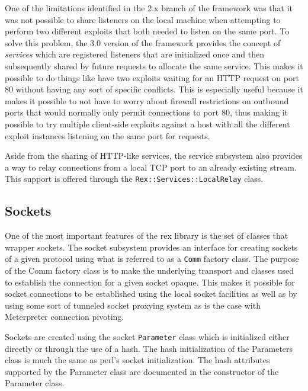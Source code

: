 \documentclass{report}
\begin{document}
\par
One of the limitations identified in the 2.x branch of the framework
was that it was not possible to share listeners on the local machine
when attempting to perform two different exploits that both needed
to listen on the same port.  To solve this problem, the 3.0 version
of the framework provides the concept of \textit{services} which are
registered listeners that are initialized once and then subsequently
shared by future requests to allocate the same service.  This makes
it possible to do things like have two exploits waiting for an HTTP
request on port 80 without having any sort of specific conflicts.
This is especially useful because it makes it possible to not have
to worry about firewall restrictions on outbound ports that would
normally only permit connections to port 80, thus making it possible
to try multiple client-side exploits against a host with all the
different exploit instances listening on the same port for requests.

\par
Aside from the sharing of HTTP-like services, the service subsystem
also provides a way to relay connections from a local TCP port to an
already existing stream.  This support is offered through the
\texttt{Rex::Services::LocalRelay} class.

        \subsection{Sockets}

\par
One of the most important features of the rex library is the set of
classes that wrapper sockets.  The socket subsystem provides an
interface for creating sockets of a given protocol using what is
referred to as a \texttt{Comm} factory class.  The purpose of the
Comm factory class is to make the underlying transport and classes
used to establish the connection for a given socket opaque.  This
makes it possible for socket connections to be established using the
local socket facilities as well as by using some sort of tunneled
socket proxying system as is the case with Meterpreter connection
pivoting.

\par
Sockets are created using the socket \texttt{Parameter} class which
is initialized either directly or through the use of a hash.  The
hash initialization of the Parameters class is much the same as
perl's socket initialization.  The hash attributes supported by the
Parameter class are documented in the constructor of the Parameter
class.
\end{document}
